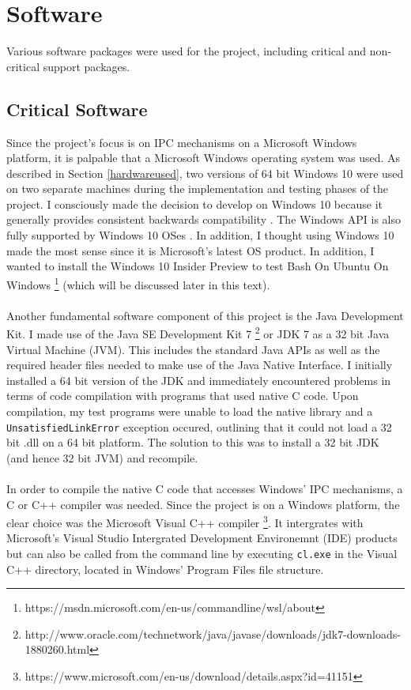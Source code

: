 \documentclass[12pt] {newrucsthesis}    %
\def\code#1{\texttt{#1}}
\begin{document}
    \section{Software} \label{softwareused}%
      Various software packages were used for the project, including critical and
      non-critical support packages.
        \subsection{Critical Software}
          Since the project's focus is on IPC mechanisms on a Microsoft Windows
          platform, it is palpable that a Microsoft Windows operating system was used. As described in
          Section \ref{hardwareused}, two versions of 64 bit Windows 10 were used on two separate
          machines during the implementation and testing phases of the project. I consciously made
          the decision to develop on Windows 10 because it generally provides
          consistent backwards compatibility \citep{win10BC}. The Windows API is also fully supported
          by Windows 10 OSes \citep{MSDN_API}. In addition, I thought using Windows 10 made the most sense
          since it is Microsoft's latest OS product. In addition, I wanted to install the Windows 10 Insider Preview
          to test Bash On Ubuntu On Windows \footnote{https://msdn.microsoft.com/en-us/commandline/wsl/about} (which will be discussed later in this text).
          \\\\
          Another fundamental software component of this project is the Java Development Kit. I made
          use of the Java SE Development Kit 7 \footnote{http://www.oracle.com/technetwork/java/javase/downloads/jdk7-downloads-1880260.html} or JDK 7 as a 32 bit Java Virtual Machine (JVM).
          This includes the standard Java APIs as well as the required header files needed to
          make use of the Java Native Interface. I initially installed a 64 bit version of the JDK and
          immediately encountered problems in terms of code compilation with programs that used native
          C code. Upon compilation, my test programs were unable to load the native library and a
          \code{UnsatisfiedLinkError} exception occured, outlining that it could not load a 32 bit .dll
          on a 64 bit platform. The solution to this was to install a 32 bit JDK (and hence 32 bit
          JVM) and recompile.
          \\\\
          In order to compile the native C code that accesses Windows' IPC mechanisms, a C or C++
          compiler was needed. Since the project is on a Windows platform, the clear choice was the
          Microsoft Visual C++ compiler \footnote{https://www.microsoft.com/en-us/download/details.aspx?id=41151}.
          It intergrates with Microsoft's Visual Studio Intergrated
          Development Environemnt (IDE) products but can also be called from the command line by
          executing \code{cl.exe} in the Visual C++ directory, located in Windows' Program Files file structure.
\end{document}
